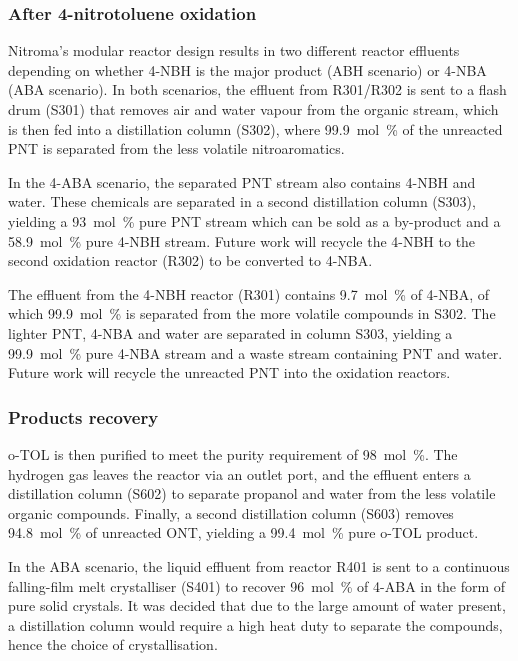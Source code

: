 \subsubsection{After 4-nitrotoluene oxidation}



Nitroma's modular reactor design results in two different reactor effluents depending on whether 4-NBH is the major product (ABH scenario) or 4-NBA (ABA scenario). In both scenarios, the effluent from R301/R302 is sent to a flash drum (S301) that removes air and water vapour from the organic stream, which is then fed into a distillation column (S302), where \SI{99.9}{mol\percent} of the unreacted PNT is separated from the less volatile nitroaromatics. 

In the 4-ABA scenario, the separated PNT stream also contains 4-NBH and water. These chemicals are separated in a second distillation column (S303), yielding a \SI{93}{mol\percent} pure PNT stream which can be sold as a by-product and a \SI{58.9}{mol\percent} pure 4-NBH stream. Future work will recycle the 4-NBH to the second oxidation reactor (R302) to be converted to 4-NBA.

The effluent from the 4-NBH reactor (R301) contains \SI{9.7}{mol\percent} of 4-NBA, of which \SI{99.9}{mol\percent} is separated from the more volatile compounds in S302. The lighter PNT, 4-NBA and water are separated in column S303, yielding a \SI{99.9}{mol\percent} pure 4-NBA stream and a waste stream containing PNT and water. Future work will recycle the unreacted PNT into the oxidation reactors.



\subsubsection{Products recovery}

o-TOL is then purified to meet the purity requirement of \SI{98}{mol\percent}.
The hydrogen gas leaves the reactor via an outlet port, and the effluent enters a distillation column (S602) to separate propanol and water from the less volatile organic compounds.
Finally, a second distillation column (S603) removes \SI{94.8}{mol\percent} of unreacted ONT, yielding a \SI{99.4}{mol\percent} pure o-TOL product.

In the ABA scenario, the liquid effluent from reactor R401 is sent to a continuous falling-film melt crystalliser (S401) to recover \SI{96}{mol\percent} of 4-ABA in the form of pure solid crystals. It was decided that due to the large amount of water present, a distillation column would require a high heat duty to separate the compounds, hence the choice of crystallisation. 

